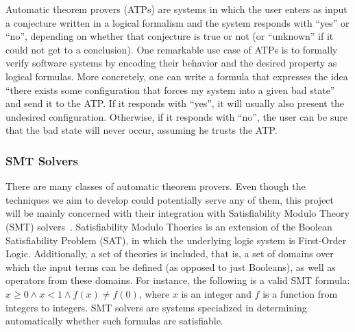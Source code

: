 \documentclass[a4paper, 12pt]{article}
\begin{document}

Automatic theorem provers (ATPs) are systems in which the user enters as input a conjecture written in
a logical
formalism and the system responds with ``yes'' or ``no'', depending on whether that conjecture is true or
not (or ``unknown'' if it could not get to a conclusion).
One remarkable use case of ATPs is to formally verify software systems by encoding
their behavior and the desired property as logical formulas. More concretely,
one can write a formula that expresses the idea ``there exists some configuration
that forces my system into a given bad state'' and send it to the ATP. If it responds
with ``yes'', it will usually also present the undesired configuration. Otherwise,
if it responds with ``no'', the user can be sure that the bad state will never occur,
assuming he trusts the ATP.

\subsubsection{SMT Solvers}

There are many classes of automatic theorem provers. Even though the techniques we aim
to develop could potentially serve any of them, this project will be mainly concerned with
their integration with Satisfiability Modulo Theory (SMT) solvers~\cite{smtbook}.
Satisfiability Modulo Thoeries is an extension of the Boolean Satisfiability Problem (SAT),
in which the underlying logic system is First-Order Logic. Additionally, a set of theories
is included, that is, a set of domains over which the input terms can be defined (as opposed
to just Booleans), as well as operators from these domains. For instance, the following is
a valid SMT formula: $x \ge 0 \wedge x < 1 \wedge f(x) \neq f(0)$, where $x$ is an integer
and $f$ is a function from integers to integers.
%
SMT solvers are systems specialized in determining automatically whether such formulas are satisfiable.
\end{document}
